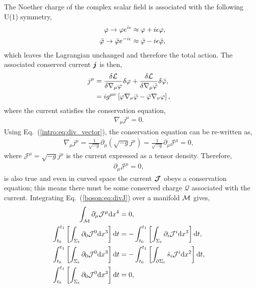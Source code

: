 The Noether charge of the complex scalar field is associated with the following U(1) symmetry,
\begin{align}
\varphi \rightarrow \varphi e^{i\epsilon} &\approx \varphi + i\epsilon \varphi , \\
\quad\bar{\varphi} \rightarrow \bar{\varphi} e^{-i\epsilon}  &\approx \bar{\varphi} - i\epsilon \bar{\varphi},
\end{align}
which leaves the Lagrangian unchanged and therefore the total action. The associated conserved current $\boldsymbol{j}$ is then,
\begin{align}
j^\mu &= \frac{\delta \mathcal{L}}{\delta \nabla_\mu\varphi}\delta \varphi + \frac{\delta \mathcal{L}}{\delta \nabla_\mu \bar{\varphi}}\delta \bar{\varphi},\\
 &=  ig^{\mu\nu}\left[\varphi\nabla_\nu\bar{\varphi} - \bar{\varphi}\nabla_\nu\varphi\right],
  \end{align}
  where the current satisfies the conservation equation,
\begin{align}
\nabla_\mu j^\mu = 0.
 \end{align}
Using Eq.~(\ref{intro:eq:div_vector}), the conservation equation can be re-written as,
\begin{align}
\nabla_\mu j^\mu = \frac{1}{\sqrt{-g}} \partial_\mu \left( \sqrt{-g} j^\mu \right) = \frac{1}{\sqrt{-g}} \partial_\mu \mathcal{J}^\mu = 0,
 \end{align}
 where $\mathcal{J}^\mu = \sqrt{-g}j^\mu$ is the current expressed as a tensor density. Therefore,
\begin{align}
\partial_\mu \mathcal{J}^\mu =0,\label{boson:eq:divJ}
 \end{align}
is also true and even in curved space the current $\boldsymbol{\mathcal{J}}$ obeys a conservation equation; this means there must be some conserved charge $\mathcal{Q}$ associated with the current. Integrating Eq.~(\ref{boson:eq:divJ}) over a manifold $\mathcal{M}$ gives,
\begin{align}
 \int_{\mathcal{M}}\partial_\mu \mathcal{J}^\mu \dd x^4&=0, \\
 \int^{t_1}_{t_0}\left[\int_{\Sigma_t} \partial_0 \mathcal{J}^0 \dd x^3 \right]\dd t &= -\int^{t_1}_{t_0}\left[\int_{\Sigma_t} \partial_i \mathcal{J}^i \dd x^3 \right]\dd t , \\
  \int^{t_1}_{t_0}\left[\int_{\Sigma_t} \partial_0 \mathcal{J}^0 \dd x^3 \right]\dd t &= -\int^{t_1}_{t_0}\left[\int_{\partial \Sigma_t} \hat{s}_i \mathcal{J}^i \dd x^2 \right]\dd t , \\
\int^{t_1}_{t_0}\left[\int_{\Sigma_t} \partial_0 \mathcal{J}^0 \dd x^3 \right]\dd t &= 0 \label{boson:eq:halfwaypointQ} ,
\end{align}
